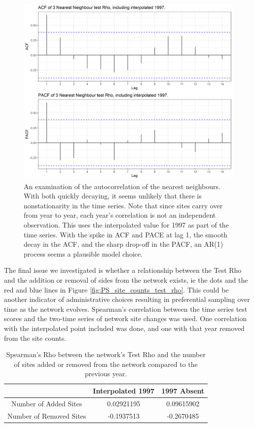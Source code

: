 \begin{figure}
\centering
\includegraphics[width = \textwidth]{Figures/PreferentialSampling/test_rho_acf_pacf_interp1997.png}
\caption{An examination of the autocorrelation of the nearest neighbours.  With both quickly decaying, it seems unlikely that there is nonstationarity in the time series.   Note that since sites carry over from year to year, each year's correlation is not an independent observation.  This uses the interpolated value for 1997 as part of the time series.  With the spike in ACF and PACE at lag 1, the smooth decay in the ACF, and the sharp drop-off in the PACF, an AR(1) process seems a plausible model choice.}
\label{fig:test_rho_acf_pacf}
\end{figure}

The final issue we investigated is whether a  relationship between the Test Rho and the addition or removal of sides from the network exists, ie the dots and the red and blue lines in Figure \ref{fig:PS_site_counts_test_rho}.  This could be another indicator of administrative choices resulting in preferential sampling over time as the network evolves.  Spearman's correlation between the time series test scores and the two-time series of network site changes was used.   One correlation with the interpolated point included was done, and one with that year removed from the site counts.

\begin{table}[ht]
\centering
\begin{tabular}{c|c|c}
	
	&  Interpolated 1997 & 1997 Absent\\
	\hline
	Number of Added Sites & 0.02921195 & 0.09615902 \\
	Number of Removed Sites & -0.1937513 & -0.2670485
\end{tabular}
\caption{Spearman's Rho between the network's Test Rho and the number of sites added or removed from the network compared to the previous year.}
\label{tab:testRho_siteChange}
\end{table}

